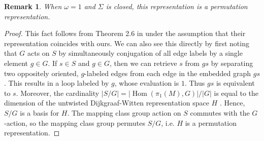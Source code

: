 \documentclass{amsart}
\newtheorem{rmk}[thm]{Remark}
\DeclareMathOperator{\Hom}{Hom}
\newcommand{\Si}{\Sigma}
\begin{document}
\begin{rmk} 
When $\omega = 1$ and $\Si$ is closed, this representation is a permutation representation.  
\end{rmk}

\begin{proof}
This fact follows from Theorem 2.6 in \cite{fjfu} under the assumption that their representation coincides with ours.  We can also see this directly by first noting that $G$ acts on $S$ by simultaneously conjugation of all edge labels by a single element $g \in G$.  If $s \in S$ and $g \in G$, then we can retrieve $s$ from $gs$ by separating two oppositely oriented, $g$-labeled edges from each edge in the embedded graph $gs$.  This results in a loop labeled by $g$, whose evaluation is $1$.  Thus $gs$ is equivalent to $s$.  Moreover, the cardinality $|S/G| = |\Hom(\pi_1(M), G)|/|G|$ is equal to the dimension of the untwisted Dijkgraaf-Witten representation space $H$ \cite{dijkgraaf1990}.  Hence, $S/G$ is a basis for $H$.  The mapping class group action on $S$ commutes with the $G$-action, so the mapping class group permutes $S/G$, i.e. $H$ is a permutation representation.
\end{proof}

\newcommand{\nc}{\newcommand}
\newcommand{\rnc}{\renewcommand}


     \nc{\lcx}{-0.5}
     \nc{\lcy}{0.866}
     \nc{\rcx}{-\lcx}
     \nc{\rcy}{\lcy}

     \nc{\makeBdy}{
       \begin{scope}[very thick,decoration={
             markings,
             mark=at position 0.5 with {\arrow{>}}}
         ]  

         \draw (-1,0) -- (\lcx, \lcy); 
         \draw (\lcx, \lcy) -- (\rcx, \rcy); 
         \draw  (1, 0) -- (\rcx, \rcy);
       \end{scope}
     }

    \nc{\lcutx}{-0.6}
    \nc{\lcuty}{0.6928}
    \nc{\lcut}{(\lcutx, \lcuty)}
    \nc{\rcutx}{-\lcutx}
    \nc{\rcuty}{\lcuty}
    \nc{\rcut}{(\rcutx, \rcuty)}

    \nc{\mvx}{0}
    \nc{\mvy}{0.2}
    \nc{\mv}{(\mvx, \mvy)}

    \nc{\outEdge}{\draw[postaction={decorate}]  (0, 0) -- \mv node[pos=.5, right]{$hgh^{-1}$};}
\end{document}
